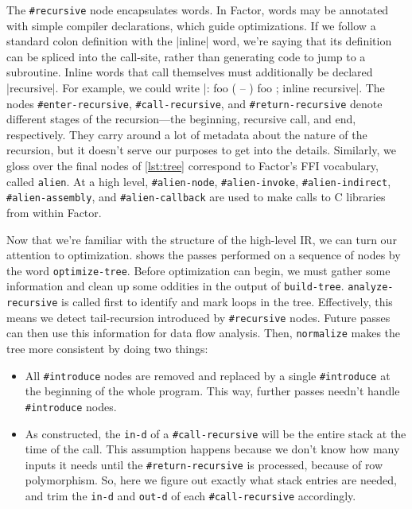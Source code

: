 The \Verb|#recursive| node encapsulates  words.  In
Factor, words may be annotated with simple compiler declarations, which guide
optimizations.  If we follow a standard colon definition with the
\factor|inline| word, we're saying that its definition can be spliced into the
call-site, rather than generating code to jump to a subroutine.  Inline words
that call themselves must additionally be declared \factor|recursive|.  For
example, we could write
%
\factor|: foo ( -- ) foo ; inline recursive|.
%
The nodes \Verb|#enter-recursive|, \Verb|#call-recursive|, and
\Verb|#return-recursive| denote different stages of the recursion---the
beginning, recursive call, and end, respectively.  They carry around a lot of
metadata about the nature of the recursion, but it doesn't serve our purposes
to get into the details.  Similarly, we gloss over the final nodes of
\cref{lst:tree} correspond to Factor's \gls{FFI} vocabulary, called
\Verb|alien|.  At a high level, \Verb|#alien-node|, \Verb|#alien-invoke|,
\Verb|#alien-indirect|, \Verb|#alien-assembly|, and
\Verb|#alien-callback| are used to make calls to C libraries from within
Factor.


Now that we're familiar with the structure of the high-level \gls{IR}, we can
turn our attention to optimization.   shows the passes
performed on a sequence of nodes by the word \Verb|optimize-tree|.  Before
optimization can begin, we must gather some information and clean up some
oddities in the output of \Verb|build-tree|.  \Verb|analyze-recursive| is
called first to identify and mark loops in the tree.  Effectively, this means
we detect tail-recursion introduced by \Verb|#recursive| nodes.  Future
passes can then use this information for data flow analysis.  Then,
\Verb|normalize| makes the tree more consistent by doing two things:
%
\begin{itemize}
%
  \item All \Verb|#introduce| nodes are removed and replaced by a single
        \Verb|#introduce| at the beginning of the whole program.  This way,
        further passes needn't handle \Verb|#introduce| nodes.
%
  \item As constructed, the \Verb|in-d| of a \Verb|#call-recursive| will be
        the entire stack at the time of the call.  This assumption happens
        because we don't know how many inputs it needs until the
        \Verb|#return-recursive| is processed, because of row polymorphism.
        So, here we figure out exactly what stack entries are needed, and trim
        the \Verb|in-d| and \Verb|out-d| of each \Verb|#call-recursive|
        accordingly.
%
\end{itemize}

